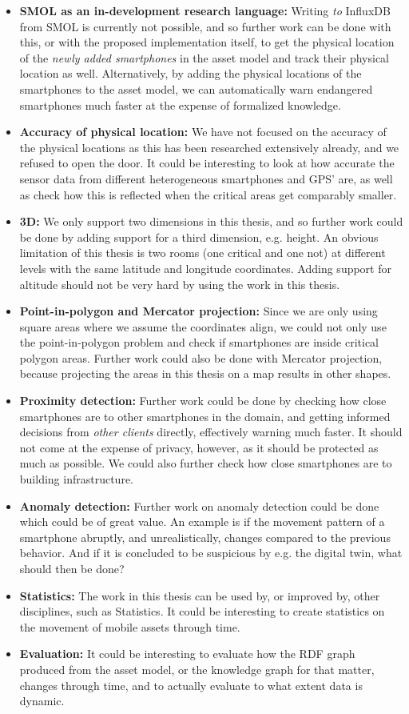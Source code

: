 \documentclass{article}
\begin{document}
\begin{itemize}
    \item \textbf{SMOL as an in-development research language:} Writing \emph{to} InfluxDB from SMOL is currently not possible, and so further work can be done with this, or with the proposed implementation itself, to get the physical location of the \emph{newly added smartphones} in the asset model and track their physical location as well. Alternatively, by adding the physical locations of the smartphones to the asset model, we can automatically warn endangered smartphones much faster at the expense of formalized knowledge.
    \item \textbf{Accuracy of physical location:} We have not focused on the accuracy of the physical locations as this has been researched extensively already, and we refused to open the door. It could be interesting to look at how accurate the sensor data from different heterogeneous smartphones and GPS' are, as well as check how this is reflected when the critical areas get comparably smaller.
    \item \textbf{3D:} We only support two dimensions in this thesis, and so further work could be done by adding support for a third dimension, e.g. height. An obvious limitation of this thesis is two rooms (one critical and one not) at different levels with the same latitude and longitude coordinates. Adding support for altitude should not be very hard by using the work in this thesis.
    \item \textbf{Point-in-polygon and Mercator projection:} Since we are only using square areas where we assume the coordinates align, we could not only use the point-in-polygon problem and check if smartphones are inside critical polygon areas. Further work could also be done with Mercator projection, because projecting the areas in this thesis on a map results in other shapes.
    \item \textbf{Proximity detection:} Further work could be done by checking how close smartphones are to other smartphones in the domain, and getting informed decisions from \emph{other clients} directly, effectively warning much faster. It should not come at the expense of privacy, however, as it should be protected as much as possible. We could also further check how close smartphones are to building infrastructure.
    \item \textbf{Anomaly detection:} Further work on anomaly detection could be done which could be of great value. An example is if the movement pattern of a smartphone abruptly, and unrealistically, changes compared to the previous behavior. And if it is concluded to be suspicious by e.g. the digital twin, what should then be done?
    \item \textbf{Statistics:} The work in this thesis can be used by, or improved by, other disciplines, such as Statistics. It could be interesting to create statistics on the movement of mobile assets through time.
    \item \textbf{Evaluation:} It could be interesting to evaluate how the RDF graph produced from the asset model, or the knowledge graph for that matter, changes through time, and to actually evaluate to what extent data is dynamic.
\end{itemize}

\newpage
\printbibliography
\end{document}
